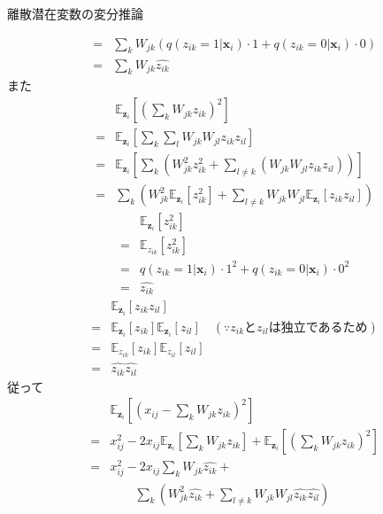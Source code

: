 \documentclass[dvipdfmx,notheorems,t]{beamer}
\begin{document}
\begin{frame}{離散潜在変数の変分推論}
\begin{itemize}
\begin{itemize}
\begin{eqnarray}
			&=& \sum_k W_{jk} \left( q(z_{ik} = 1 | \bm{x}_i) \cdot 1 + q(z_{ik} = 0 | \bm{x}_i) \cdot 0 \right) \\
			&=& \sum_k W_{jk} \widehat{z_{ik}}
		\end{eqnarray}
		また
		\begin{eqnarray}
			&& \mathbb{E}_{\bm{z}_i} \left[ \left( \sum_k W_{jk} z_{ik} \right)^2 \right] \nonumber \\
			&=& \mathbb{E}_{\bm{z}_i} \left[ \sum_k \sum_l W_{jk} W_{jl} z_{ik} z_{il} \right] \\
			&=& \mathbb{E}_{\bm{z}_i} \left[ \sum_k \left( W_{jk}^2 z_{ik}^2 + \sum_{l \neq k} \left( W_{jk} W_{jl} z_{ik} z_{il} \right) \right) \right] \\
			&=& \sum_k \left( W_{jk}^2 \mathbb{E}_{\bm{z}_i} \left[ z_{ik}^2 \right] + \sum_{l \neq k} W_{jk} W_{jl} \mathbb{E}_{\bm{z}_i} \left[ z_{ik} z_{il} \right] \right)
		\end{eqnarray}
		\begin{eqnarray}
			&& \mathbb{E}_{\bm{z}_i} \left[ z_{ik}^2 \right] \nonumber \\
			&=& \mathbb{E}_{z_{ik}} \left[ z_{ik}^2 \right] \\
			&=& q(z_{ik} = 1 | \bm{x}_i) \cdot 1^2 + q(z_{ik} = 0 | \bm{x}_i) \cdot 0^2 \\
			&=& \widehat{z_{ik}}
		\end{eqnarray}
		\begin{eqnarray}
			&& \mathbb{E}_{\bm{z}_i} \left[ z_{ik} z_{il} \right] \nonumber \\
			&=& \mathbb{E}_{\bm{z}_i} \left[ z_{ik} \right] \mathbb{E}_{\bm{z}_i} \left[ z_{il} \right] \quad (\because \text{$z_{ik}$と$z_{il}$は独立であるため}) \\
			&=& \mathbb{E}_{z_{ik}} \left[ z_{ik} \right] \mathbb{E}_{z_{il}} \left[ z_{il} \right] \\
			&=& \widehat{z_{ik}} \widehat{z_{il}}
		\end{eqnarray}
		従って
		\begin{eqnarray}
			&& \mathbb{E}_{\bm{z}_i} \left[ \left( x_{ij} - \sum_k W_{jk} z_{ik} \right)^2 \right] \nonumber \\
			&=& x_{ij}^2 - 2 x_{ij} \mathbb{E}_{\bm{z}_i} \left[ \sum_k W_{jk} z_{ik} \right] + \mathbb{E}_{\bm{z}_i} \left[ \left( \sum_k W_{jk} z_{ik} \right)^2 \right] \\
			&=& x_{ij}^2 - 2 x_{ij} \sum_k W_{jk} \widehat{z_{ik}} + \nonumber \\
			&& \qquad \sum_k \left( W_{jk}^2 \widehat{z_{ik}} + \sum_{l \neq k} W_{jk} W_{jl} \widehat{z_{ik}} \widehat{z_{il}} \right)

\end{eqnarray}
\end{itemize}
\end{itemize}
\end{frame}
\end{document}

